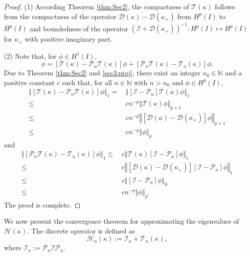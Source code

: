 \documentclass{article}
\newcommand{\norm}[1]{\left\Vert#1\right\Vert}
\begin{document}
	\begin{proof}
		(1) According Theorem \ref{thm:Sec2}, the compactness of $\mathcal{T}(\kappa)$ follows from the compactness of  the  operator $\mathcal{D}(\kappa)-\mathcal{D}(\kappa_+)$ from $H^{p}(I)$ to $H^{p}(I)$ and boundedness of the operator $(\mathcal{I}+\mathcal{D}(\kappa_+))^{-1}:H^p(I)\mapsto H^p(I)$ for $\kappa_+$ with positive imaginary part.
		
		(2) Note that, for $\phi\in H^{1}(I)$,
		\begin{equation*}
			[\mathcal{T}(\kappa)-\mathcal{T}_n(\kappa)]\phi=[\mathcal{T}(\kappa)-\mathcal{P}_n\mathcal{T}(\kappa)]\phi+[\mathcal{P}_n\mathcal{T}(\kappa)-\mathcal{T}_n(\kappa)]\phi.
		\end{equation*}
		Due to Theorem \ref{thm:Sec2} and \eqref{sec3:proj},
		there exist an integer $n_0\in\mathbb{N}$ and a positive constant $c$ such that, for all $n\in\mathbb{N}$ with $n>n_0$ and $\phi\in H^{p}(I)$,
	    \begin{align*}
	    	\norm{[\mathcal{T}(\kappa)-\mathcal{P}_n\mathcal{T}(\kappa)]\phi}_{1}
	    	=&\, \norm{[\mathcal{I}-\mathcal{P}_n]\mathcal{T}(\kappa)\phi}_{1} \\
	    	\leq&\, c n^{-p}\norm{\mathcal{T}(\kappa)\phi}_{p+1}\\
	    	\leq&\, c n^{-p}\norm{[\mathcal{D}(\kappa)-\mathcal{D}(\kappa_+)]\phi}_{p+1} \\
	    	\leq&\, c n^{-p}\norm{\phi}_{p}
	    \end{align*} 
	    and
	    \begin{align*}
	    	\norm{[\mathcal{P}_n\mathcal{T}(\kappa)-\mathcal{T}_n(\kappa)]\phi}_{1}
	    	\leq&\, c\norm{\mathcal{T}(\kappa)[\mathcal{I}-\mathcal{P}_n]\phi}_{1}\\
	    	\leq&\, c \norm{[\mathcal{D}(\kappa)-\mathcal{D}(\kappa_+)][\mathcal{I}-\mathcal{P}_n]\phi}_{1}\\
	    	\leq&\, c \norm{[\mathcal{I}-\mathcal{P}_n]\phi}_{0} \\
	    	\leq& \,c n^{-p}\norm{\phi}_{p}.
	    \end{align*} 
	    The proof is complete.

	\end{proof}
	
	
	We now present the convergence theorem for approximating the eigenvalues of $\mathcal{H}(\kappa)$. The discrete operator is defined as
	\begin{equation*}
		\mathcal{H}_{n}(\kappa):=\mathcal{I}_n+\mathcal{T}_{n}(\kappa),
	\end{equation*}
	where $\mathcal{I}_n:=\mathcal{P}_n\mathcal{I}\mathcal{P}_n$.
	
\end{document}
